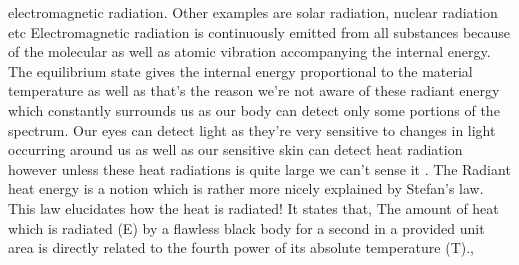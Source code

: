 electromagnetic radiation. Other examples are solar radiation,
nuclear radiation etc Electromagnetic radiation is continuously
emitted from all substances because of the molecular as well as
atomic vibration accompanying the internal energy. The equilibrium
state gives the internal energy proportional to the material
temperature as well as that’s the reason we’re not aware of these
radiant energy which constantly surrounds us as our body can detect
only some portions of the spectrum. Our eyes can detect light as
they’re very sensitive to changes in light occurring around us as well
as our sensitive skin can detect heat radiation however unless these
heat radiations is quite large we can’t sense it .
The Radiant heat energy is a notion which is rather more nicely
explained by Stefan’s law. This law elucidates how the heat is
radiated! It states that, The amount of heat which is radiated (E) by
a flawless black body for a second in a provided unit area is directly
related to the fourth power of its absolute temperature (T)., 


